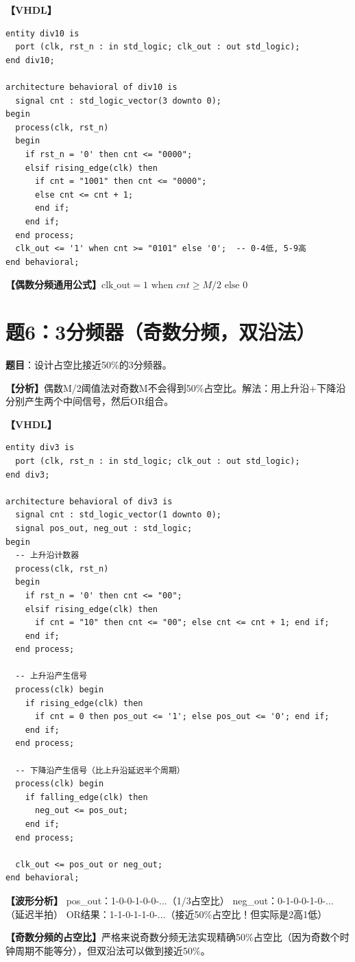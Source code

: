 \begin{solution}[完整解答]

\textbf{【VHDL】}
\begin{lstlisting}
entity div10 is
  port (clk, rst_n : in std_logic; clk_out : out std_logic);
end div10;

architecture behavioral of div10 is
  signal cnt : std_logic_vector(3 downto 0);
begin
  process(clk, rst_n)
  begin
    if rst_n = '0' then cnt <= "0000";
    elsif rising_edge(clk) then
      if cnt = "1001" then cnt <= "0000";
      else cnt <= cnt + 1;
      end if;
    end if;
  end process;
  clk_out <= '1' when cnt >= "0101" else '0';  -- 0-4低, 5-9高
end behavioral;
\end{lstlisting}

\textbf{【偶数分频通用公式】}$\text{clk\_out} = 1 \text{ when } cnt \geq M/2 \text{ else } 0$

\end{solution}


\section{题6：3分频器（奇数分频，双沿法）}

\textbf{题目}：设计占空比接近50\%的3分频器。

\begin{solution}[完整解答]

\textbf{【分析】}偶数M/2阈值法对奇数M不会得到50\%占空比。解法：用上升沿+下降沿分别产生两个中间信号，然后OR组合。

\textbf{【VHDL】}
\begin{lstlisting}
entity div3 is
  port (clk, rst_n : in std_logic; clk_out : out std_logic);
end div3;

architecture behavioral of div3 is
  signal cnt : std_logic_vector(1 downto 0);
  signal pos_out, neg_out : std_logic;
begin
  -- 上升沿计数器
  process(clk, rst_n)
  begin
    if rst_n = '0' then cnt <= "00";
    elsif rising_edge(clk) then
      if cnt = "10" then cnt <= "00"; else cnt <= cnt + 1; end if;
    end if;
  end process;

  -- 上升沿产生信号
  process(clk) begin
    if rising_edge(clk) then
      if cnt = 0 then pos_out <= '1'; else pos_out <= '0'; end if;
    end if;
  end process;

  -- 下降沿产生信号（比上升沿延迟半个周期）
  process(clk) begin
    if falling_edge(clk) then
      neg_out <= pos_out;
    end if;
  end process;

  clk_out <= pos_out or neg_out;
end behavioral;
\end{lstlisting}

\textbf{【波形分析】}
pos\_out：1-0-0-1-0-0-...（1/3占空比）
neg\_out：0-1-0-0-1-0-...（延迟半拍）
OR结果：1-1-0-1-1-0-...（接近50\%占空比！但实际是2高1低）

\textbf{【奇数分频的占空比】}严格来说奇数分频无法实现精确50\%占空比（因为奇数个时钟周期不能等分），但双沿法可以做到接近50\%。

\end{solution}


